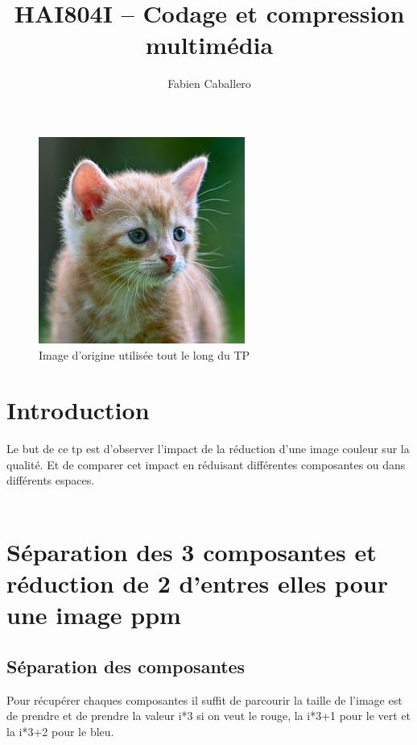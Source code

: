 \documentclass{article}
\title{HAI804I – Codage et compression multimédia
}
\author{Fabien Caballero}
\begin{document}
\maketitle
    \tableofcontents

\newpage

\begin{figure}[h]
\centerline{\includegraphics[scale=0.3]{./rendus/Chalex.png}}
\caption{Image d'origine utilisée tout le long du TP}
\end{figure}

\section*{Introduction}
Le but de ce tp est d'observer l'impact de la réduction d'une image couleur sur la qualité.
Et de comparer cet impact en réduisant différentes composantes ou dans différents espaces.
\\\\
\section{Séparation des 3 composantes et réduction de 2 d'entres elles pour une image ppm}

\subsection{Séparation des composantes}
Pour récupérer chaques composantes il suffit de parcourir la taille de l'image est de prendre et de prendre la valeur i*3 si on veut le rouge, la i*3+1 pour le vert et la i*3+2 pour le bleu.
\end{document}
